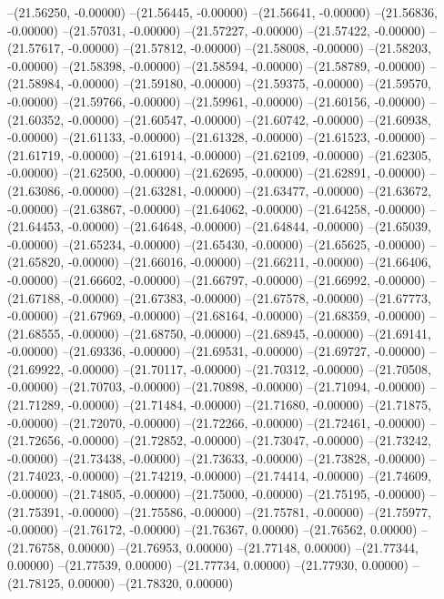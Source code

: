 --(21.56250, -0.00000)
--(21.56445, -0.00000)
--(21.56641, -0.00000)
--(21.56836, -0.00000)
--(21.57031, -0.00000)
--(21.57227, -0.00000)
--(21.57422, -0.00000)
--(21.57617, -0.00000)
--(21.57812, -0.00000)
--(21.58008, -0.00000)
--(21.58203, -0.00000)
--(21.58398, -0.00000)
--(21.58594, -0.00000)
--(21.58789, -0.00000)
--(21.58984, -0.00000)
--(21.59180, -0.00000)
--(21.59375, -0.00000)
--(21.59570, -0.00000)
--(21.59766, -0.00000)
--(21.59961, -0.00000)
--(21.60156, -0.00000)
--(21.60352, -0.00000)
--(21.60547, -0.00000)
--(21.60742, -0.00000)
--(21.60938, -0.00000)
--(21.61133, -0.00000)
--(21.61328, -0.00000)
--(21.61523, -0.00000)
--(21.61719, -0.00000)
--(21.61914, -0.00000)
--(21.62109, -0.00000)
--(21.62305, -0.00000)
--(21.62500, -0.00000)
--(21.62695, -0.00000)
--(21.62891, -0.00000)
--(21.63086, -0.00000)
--(21.63281, -0.00000)
--(21.63477, -0.00000)
--(21.63672, -0.00000)
--(21.63867, -0.00000)
--(21.64062, -0.00000)
--(21.64258, -0.00000)
--(21.64453, -0.00000)
--(21.64648, -0.00000)
--(21.64844, -0.00000)
--(21.65039, -0.00000)
--(21.65234, -0.00000)
--(21.65430, -0.00000)
--(21.65625, -0.00000)
--(21.65820, -0.00000)
--(21.66016, -0.00000)
--(21.66211, -0.00000)
--(21.66406, -0.00000)
--(21.66602, -0.00000)
--(21.66797, -0.00000)
--(21.66992, -0.00000)
--(21.67188, -0.00000)
--(21.67383, -0.00000)
--(21.67578, -0.00000)
--(21.67773, -0.00000)
--(21.67969, -0.00000)
--(21.68164, -0.00000)
--(21.68359, -0.00000)
--(21.68555, -0.00000)
--(21.68750, -0.00000)
--(21.68945, -0.00000)
--(21.69141, -0.00000)
--(21.69336, -0.00000)
--(21.69531, -0.00000)
--(21.69727, -0.00000)
--(21.69922, -0.00000)
--(21.70117, -0.00000)
--(21.70312, -0.00000)
--(21.70508, -0.00000)
--(21.70703, -0.00000)
--(21.70898, -0.00000)
--(21.71094, -0.00000)
--(21.71289, -0.00000)
--(21.71484, -0.00000)
--(21.71680, -0.00000)
--(21.71875, -0.00000)
--(21.72070, -0.00000)
--(21.72266, -0.00000)
--(21.72461, -0.00000)
--(21.72656, -0.00000)
--(21.72852, -0.00000)
--(21.73047, -0.00000)
--(21.73242, -0.00000)
--(21.73438, -0.00000)
--(21.73633, -0.00000)
--(21.73828, -0.00000)
--(21.74023, -0.00000)
--(21.74219, -0.00000)
--(21.74414, -0.00000)
--(21.74609, -0.00000)
--(21.74805, -0.00000)
--(21.75000, -0.00000)
--(21.75195, -0.00000)
--(21.75391, -0.00000)
--(21.75586, -0.00000)
--(21.75781, -0.00000)
--(21.75977, -0.00000)
--(21.76172, -0.00000)
--(21.76367, 0.00000)
--(21.76562, 0.00000)
--(21.76758, 0.00000)
--(21.76953, 0.00000)
--(21.77148, 0.00000)
--(21.77344, 0.00000)
--(21.77539, 0.00000)
--(21.77734, 0.00000)
--(21.77930, 0.00000)
--(21.78125, 0.00000)
--(21.78320, 0.00000)

